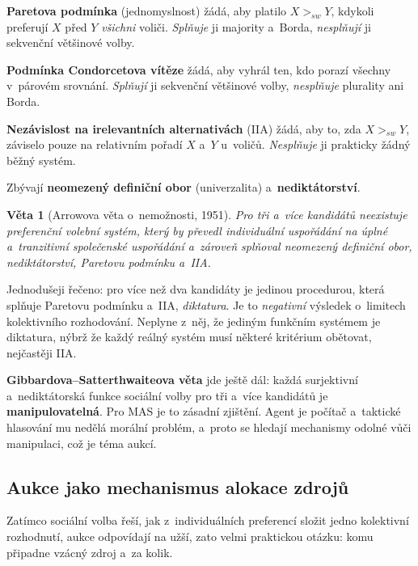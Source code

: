 \documentclass[11pt,a4paper]{article}
\newtheorem{veta}{Věta}[section]
\theoremstyle{definition}
\begin{document}
\begin{defbox}
\textbf{Paretova podmínka} (jednomyslnost) žádá, aby platilo $X >_{sw} Y$, kdykoli preferují
$X$ před $Y$ \emph{všichni} voliči. \emph{Splňuje} ji majority a~Borda, \emph{nesplňují} ji
sekvenční většinové volby.

\textbf{Podmínka Condorcetova vítěze} žádá, aby vyhrál ten, kdo porazí všechny v~párovém
srovnání. \emph{Splňují} ji sekvenční většinové volby, \emph{nesplňuje} plurality ani Borda.

\textbf{Nezávislost na irelevantních alternativách} (IIA) žádá, aby to, zda $X >_{sw} Y$,
záviselo pouze na relativním pořadí $X$ a~$Y$ u~voličů. \emph{Nesplňuje} ji prakticky žádný
běžný systém.

Zbývají \textbf{neomezený definiční obor} (univerzalita) a~\textbf{nediktátorství}.
\end{defbox}

\begin{veta}[Arrowova věta o~nemožnosti, 1951]
Pro tři a~více kandidátů neexistuje preferenční volební systém, který by převedl individuální
uspořádání na úplné a~tranzitivní společenské uspořádání a~zároveň splňoval neomezený definiční
obor, nediktátorství, Paretovu podmínku a~IIA.
\end{veta}

Jednodušeji řečeno: pro více než dva kandidáty je jedinou procedurou, která splňuje Paretovu
podmínku a~IIA, \emph{diktatura}. Je to \emph{negativní} výsledek o~limitech kolektivního
rozhodování. Neplyne z~něj, že jediným funkčním systémem je diktatura, nýbrž že každý reálný
systém musí některé kritérium obětovat, nejčastěji IIA.

\textbf{Gibbardova--Satterthwaiteova věta} jde ještě dál: každá surjektivní a~nediktátorská
funkce sociální volby pro tři a~více kandidátů je \textbf{manipulovatelná}. Pro MAS je to
zásadní zjištění. Agent je počítač a~taktické hlasování mu nedělá morální problém, a~proto se
hledají mechanismy odolné vůči manipulaci, což je téma aukcí.

\subsection{Aukce jako mechanismus alokace zdrojů}
\label{ssec:aukce}

Zatímco sociální volba řeší, jak z~individuálních preferencí složit jedno kolektivní rozhodnutí,
aukce odpovídají na užší, zato velmi praktickou otázku: komu připadne vzácný zdroj a~za kolik.
\end{document}
